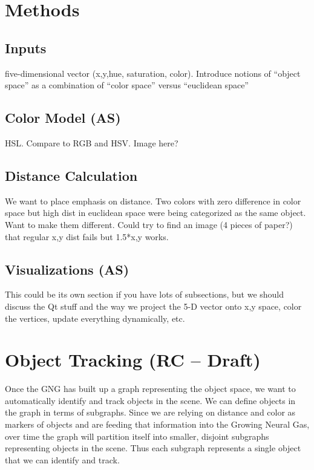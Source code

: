 \documentclass{article}
\renewcommand{\|}{\origbar} %
\begin{document}
\section{Methods}

\subsection{Inputs}

five-dimensional vector (x,y,hue, saturation, color). Introduce notions of ``object space'' as a combination of ``color space'' versus ``euclidean space''

\subsection{Color Model (AS)}

HSL. Compare to RGB and HSV. Image here?

\subsection{Distance Calculation}

We want to place emphasis on distance. Two colors with zero difference in color space but high dist in euclidean space were being categorized as the same object. Want to make them different. Could try to find an image (4 pieces of paper?) that regular x,y dist fails but 1.5*x,y works.

\subsection{Visualizations (AS)}

This could be its own section if you have lots of subsections, but we should discuss the Qt stuff and the way we project the 5-D vector onto x,y space, color the vertices, update everything dynamically, etc.

\section{Object Tracking (RC -- Draft)}

Once the GNG has built up a graph representing the object space, we want to automatically identify and track objects in the scene. We can define objects in the graph in terms of subgraphs. Since we are relying on distance and color as markers of objects and are feeding that information into the Growing Neural Gas, over time the graph will partition itself into smaller, disjoint subgraphs representing objects in the scene. Thus each subgraph represents a single object that we can identify and track.
\end{document}
